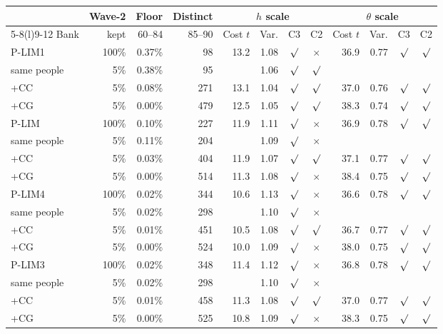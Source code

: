 \begin{center}\footnotesize\setlength{\tabcolsep}{4pt}
\begin{tabular}{@{}lrrrrrccrrcc@{}}
\toprule
 & Wave-2 & Floor & Distinct & \multicolumn{4}{c}{$h$ scale} & \multicolumn{4}{c}{$\theta$ scale} \\
\cmidrule(lr){5-8}\cmidrule(l){9-12}
Bank & kept & 60--84 & 85--90 & Cost $t$ & Var. & C3 & C2 & Cost $t$ & Var. & C3 & C2 \\
\midrule
P-LIM1 & 100\% & 0.37\% & 98 & 13.2 & 1.08 & $\surd$ & $\times$ & 36.9 & 0.77 & $\surd$ & $\surd$ \\
\quad same people & 5\% & 0.38\% & 95 & & 1.06 & $\surd$ & $\surd$ & & & & \\
\quad +CC & 5\% & 0.08\% & 271 & 13.1 & 1.04 & $\surd$ & $\surd$ & 37.0 & 0.76 & $\surd$ & $\surd$ \\
\quad +CG & 5\% & 0.00\% & 479 & 12.5 & 1.05 & $\surd$ & $\surd$ & 38.3 & 0.74 & $\surd$ & $\surd$ \\
\addlinespace
P-LIM & 100\% & 0.10\% & 227 & 11.9 & 1.11 & $\surd$ & $\times$ & 36.9 & 0.78 & $\surd$ & $\surd$ \\
\quad same people & 5\% & 0.11\% & 204 & & 1.09 & $\surd$ & $\times$ & & & & \\
\quad +CC & 5\% & 0.03\% & 404 & 11.9 & 1.07 & $\surd$ & $\surd$ & 37.1 & 0.77 & $\surd$ & $\surd$ \\
\quad +CG & 5\% & 0.00\% & 514 & 11.3 & 1.08 & $\surd$ & $\times$ & 38.4 & 0.75 & $\surd$ & $\surd$ \\
\addlinespace
P-LIM4 & 100\% & 0.02\% & 344 & 10.6 & 1.13 & $\surd$ & $\times$ & 36.6 & 0.78 & $\surd$ & $\surd$ \\
\quad same people & 5\% & 0.02\% & 298 & & 1.10 & $\surd$ & $\times$ & & & & \\
\quad +CC & 5\% & 0.01\% & 451 & 10.5 & 1.08 & $\surd$ & $\surd$ & 36.7 & 0.77 & $\surd$ & $\surd$ \\
\quad +CG & 5\% & 0.00\% & 524 & 10.0 & 1.09 & $\surd$ & $\times$ & 38.0 & 0.75 & $\surd$ & $\surd$ \\
\addlinespace
P-LIM3 & 100\% & 0.02\% & 348 & 11.4 & 1.12 & $\surd$ & $\times$ & 36.8 & 0.78 & $\surd$ & $\surd$ \\
\quad same people & 5\% & 0.02\% & 298 & & 1.10 & $\surd$ & $\times$ & & & & \\
\quad +CC & 5\% & 0.01\% & 458 & 11.3 & 1.08 & $\surd$ & $\surd$ & 37.0 & 0.77 & $\surd$ & $\surd$ \\
\quad +CG & 5\% & 0.00\% & 525 & 10.8 & 1.09 & $\surd$ & $\times$ & 38.3 & 0.75 & $\surd$ & $\surd$ \\

\end{tabular}
\end{center}
